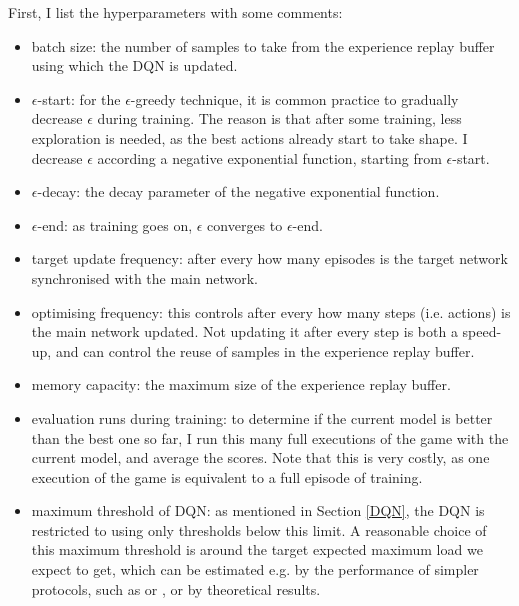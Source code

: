 First, I list the hyperparameters with some comments:

\begin{itemize} 
    \item batch size: the number of samples to take from the experience replay buffer using which the DQN is updated.
    
    \item $\epsilon$-start: for the $\epsilon$-greedy technique, it is common practice to gradually decrease $\epsilon$ during training. The reason is that after some training, less exploration is needed, as the best actions already start to take shape. I decrease $\epsilon$ according a negative exponential function, starting from $\epsilon$-start.
    
    \item $\epsilon$-decay: the decay parameter of the negative exponential function.
    
    \item $\epsilon$-end: as training goes on, $\epsilon$ converges to $\epsilon$-end.
     
    
    \item target update frequency: after every how many episodes is the target network synchronised with the main network.
    
    \item optimising frequency: this controls after every how many steps (i.e. actions) is the main network updated. Not updating it after every step is both a speed-up, and can control the reuse of samples in the experience replay buffer.
    
    \item memory capacity: the maximum size of the experience replay buffer.
    
    \item evaluation runs during training: to determine if the current model is better than the best one so far, I run this many full executions of the game with the current model, and average the scores. Note that this is very costly, as one execution of the game is equivalent to a full episode of training.
    
    \item maximum threshold of DQN: as mentioned in Section \ref{DQN}, the DQN is restricted to using only thresholds below this limit. A reasonable choice of this maximum threshold is around the target expected maximum load we expect to get, which can be estimated e.g. by the performance of simpler protocols, such as \OneChoice or \TwoChoice, or by theoretical results.
    

\end{itemize}
